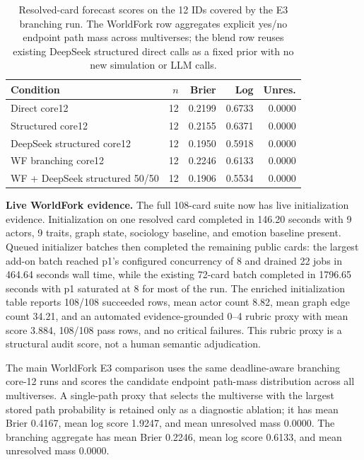 \documentclass{article}
\begin{document}
\begin{table}[t]
\centering
\footnotesize
\begin{tabular}{lrrrr}
\toprule
Condition & $n$ & Brier & Log & Unres. \\
\midrule
Direct core12 & 12 & 0.2199 & 0.6733 & 0.0000 \\
Structured core12 & 12 & 0.2155 & 0.6371 & 0.0000 \\
DeepSeek structured core12 & 12 & 0.1950 & 0.5918 & 0.0000 \\
WF branching core12 & 12 & 0.2246 & 0.6133 & 0.0000 \\
WF + DeepSeek structured 50/50 & 12 & 0.1906 & 0.5534 & 0.0000 \\
\bottomrule
\end{tabular}
\caption{Resolved-card forecast scores on the 12 IDs covered by the E3 branching run. The WorldFork row aggregates explicit yes/no endpoint path mass across multiverses; the blend row reuses existing DeepSeek structured direct calls as a fixed prior with no new simulation or LLM calls.}
\label{tab:forecast}
\end{table}

\textbf{Live WorldFork evidence.} The full 108-card suite now has live initialization evidence. Initialization on one resolved card completed in 146.20 seconds with 9 actors, 9 traits, graph state, sociology baseline, and emotion baseline present. Queued initializer batches then completed the remaining public cards: the largest add-on batch reached p1's configured concurrency of 8 and drained 22 jobs in 464.64 seconds wall time, while the existing 72-card batch completed in 1796.65 seconds with p1 saturated at 8 for most of the run. The enriched initialization table reports 108/108 succeeded rows, mean actor count 8.82, mean graph edge count 34.21, and an automated evidence-grounded 0--4 rubric proxy with mean score 3.884, 108/108 pass rows, and no critical failures. This rubric proxy is a structural audit score, not a human semantic adjudication.

The main WorldFork E3 comparison uses the same deadline-aware branching core-12 runs and scores the candidate endpoint path-mass distribution across all multiverses. A single-path proxy that selects the multiverse with the largest stored path probability is retained only as a diagnostic ablation; it has mean Brier 0.4167, mean log score 1.9247, and mean unresolved mass 0.0000. The branching aggregate has mean Brier 0.2246, mean log score 0.6133, and mean unresolved mass 0.0000.
\end{document}
